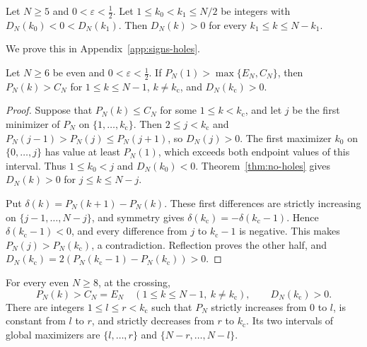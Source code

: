 \begin{theorem}[no holes]\label{thm:no-holes}
Let $N\ge5$ and $0<\varepsilon<\frac12$. Let $1\le k_0<k_1\le N/2$ be integers
with $D_N(k_0)<0<D_N(k_1)$. Then $D_N(k)>0$ for every $k_1\le k\le N-k_1$.
\end{theorem}

We prove this in Appendix~\ref{app:signs-holes}.

\begin{lemma}\label{lem:center-no-holes}
Let $N\ge6$ be even and $0<\varepsilon<\frac12$. If
$P_N(1)>\max\{E_N,C_N\}$, then
$P_N(k)>C_N$ for $1\le k\le N-1$, $k\ne {k_{\mathrm c}}$, and $D_N({k_{\mathrm c}})>0$.
\end{lemma}

\begin{proof}
Suppose that $P_N(k)\le C_N$ for some $1\le k<{k_{\mathrm c}}$, and let $j$ be the first
minimizer of $P_N$ on $\{1,\dots,{k_{\mathrm c}}\}$. Then $2\le j<{k_{\mathrm c}}$ and
$P_N(j-1)>P_N(j)\le P_N(j+1)$, so $D_N(j)>0$.
The first maximizer $k_0$ on $\{0,\dots,j\}$ has value at least $P_N(1)$,
which exceeds both endpoint values of this interval. Thus $1\le k_0<j$
and $D_N(k_0)<0$. Theorem~\ref{thm:no-holes} gives $D_N(k)>0$ for
$j\le k\le N-j$.

Put $\delta(k)=P_N(k+1)-P_N(k)$. These first differences are strictly
increasing on $\{j-1,\dots,N-j\}$, and symmetry gives
$\delta({k_{\mathrm c}})=-\delta({k_{\mathrm c}}-1)$. Hence $\delta({k_{\mathrm c}}-1)<0$, and every difference
from $j$ to ${k_{\mathrm c}}-1$ is negative. This makes $P_N(j)>P_N({k_{\mathrm c}})$, a contradiction.
Reflection proves the other half, and
$D_N({k_{\mathrm c}})=2(P_N({k_{\mathrm c}}-1)-P_N({k_{\mathrm c}}))>0$.
\end{proof}

\begin{corollary}\label{cor:unique-min}
For every even $N\ge8$, at the crossing,
\[
 P_N(k)>C_N=E_N\quad(1\le k\le N-1,\ k\ne {k_{\mathrm c}}),\qquad D_N({k_{\mathrm c}})>0.
\]
There are integers $1\le l\le r<{k_{\mathrm c}}$ such that $P_N$ strictly increases
from $0$ to $l$, is constant from $l$ to $r$, and strictly decreases
from $r$ to ${k_{\mathrm c}}$. Its two intervals of global maximizers are
$\{l,\dots,r\}$ and $\{N-r,\dots,N-l\}$.
\end{corollary}

